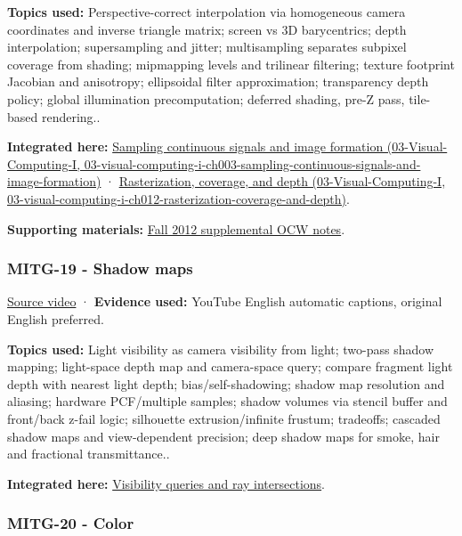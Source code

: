 \textbf{Topics used:} Perspective-correct interpolation via homogeneous camera coordinates and inverse triangle matrix; screen vs 3D barycentrics; depth interpolation; supersampling and jitter; multisampling separates subpixel coverage from shading; mipmapping levels and trilinear filtering; texture footprint Jacobian and anisotropy; ellipsoidal filter approximation; transparency depth policy; global illumination precomputation; deferred shading, pre-Z pass, tile-based rendering..

\textbf{Integrated here:} \href{../03-Visual-Computing-I/main.pdf\#nameddest=03-visual-computing-i-ch003-sampling-continuous-signals-and-image-formation}{Sampling continuous signals and image formation (03-Visual-Computing-I, 03-visual-computing-i-ch003-sampling-continuous-signals-and-image-formation)} · \href{../03-Visual-Computing-I/main.pdf\#nameddest=03-visual-computing-i-ch012-rasterization-coverage-and-depth}{Rasterization, coverage, and depth (03-Visual-Computing-I, 03-visual-computing-i-ch012-rasterization-coverage-and-depth)}.

\textbf{Supporting materials:} \href{https://ocw.mit.edu/courses/6-837-computer-graphics-fall-2012/pages/lecture-notes/}{Fall 2012 supplemental OCW notes}.

\subsubsection{MITG-19 - Shadow maps}\label{04-visual-computing-ii-ch036-mitg-19---shadow-maps}

\href{https://www.youtube.com/watch?v=jDw_EbXv-1I}{Source video} · \textbf{Evidence used:} YouTube English automatic captions, original English preferred.

\textbf{Topics used:} Light visibility as camera visibility from light; two-pass shadow mapping; light-space depth map and camera-space query; compare fragment light depth with nearest light depth; bias/self-shadowing; shadow map resolution and aliasing; hardware PCF/multiple samples; shadow volumes via stencil buffer and front/back z-fail logic; silhouette extrusion/infinite frustum; tradeoffs; cascaded shadow maps and view-dependent precision; deep shadow maps for smoke, hair and fractional transmittance..

\textbf{Integrated here:} \hyperref[04-visual-computing-ii-ch028-visibility-queries-and-ray-intersections-1]{Visibility queries and ray intersections}.

\subsubsection{MITG-20 - Color}\label{04-visual-computing-ii-ch036-mitg-20---color}

